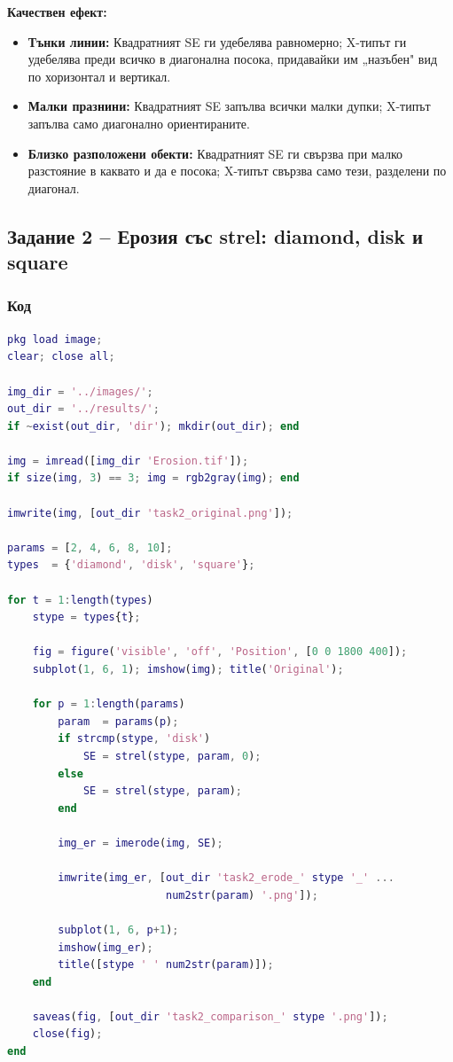 \textbf{Качествен ефект:}
\begin{itemize}
    \item \textbf{Тънки линии:} Квадратният SE ги удебелява равномерно; X-типът ги удебелява преди всичко в диагонална посока, придавайки им „назъбен" вид по хоризонтал и вертикал.
    \item \textbf{Малки празнини:} Квадратният SE запълва всички малки дупки; X-типът запълва само диагонално ориентираните.
    \item \textbf{Близко разположени обекти:} Квадратният SE ги свързва при малко разстояние в каквато и да е посока; X-типът свързва само тези, разделени по диагонал.
\end{itemize}

\subsection{Задание 2 – Ерозия със strel: diamond, disk и square}

\subsubsection{Код}

\begin{lstlisting}[language=Matlab, caption={task2\_erosion.m}]
pkg load image;
clear; close all;

img_dir = '../images/';
out_dir = '../results/';
if ~exist(out_dir, 'dir'); mkdir(out_dir); end

img = imread([img_dir 'Erosion.tif']);
if size(img, 3) == 3; img = rgb2gray(img); end

imwrite(img, [out_dir 'task2_original.png']);

params = [2, 4, 6, 8, 10];
types  = {'diamond', 'disk', 'square'};

for t = 1:length(types)
    stype = types{t};

    fig = figure('visible', 'off', 'Position', [0 0 1800 400]);
    subplot(1, 6, 1); imshow(img); title('Original');

    for p = 1:length(params)
        param  = params(p);
        if strcmp(stype, 'disk')
            SE = strel(stype, param, 0);
        else
            SE = strel(stype, param);
        end

        img_er = imerode(img, SE);

        imwrite(img_er, [out_dir 'task2_erode_' stype '_' ...
                         num2str(param) '.png']);

        subplot(1, 6, p+1);
        imshow(img_er);
        title([stype ' ' num2str(param)]);
    end

    saveas(fig, [out_dir 'task2_comparison_' stype '.png']);
    close(fig);
end
\end{lstlisting}

